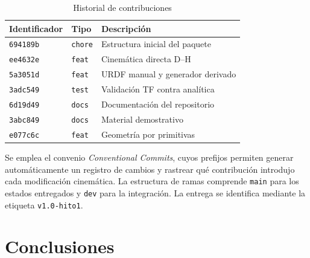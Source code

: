 \documentclass[11pt,a4paper]{article}
\begin{document}
\begin{table}[h]
\centering
\caption{Historial de contribuciones}
\label{tab:commits}
\small
\begin{tabular}{@{}lll@{}}
\toprule
\textbf{Identificador} & \textbf{Tipo} & \textbf{Descripción} \\
\midrule
\texttt{694189b} & \texttt{chore} & Estructura inicial del paquete \\
\texttt{ee4632e} & \texttt{feat} & Cinemática directa D--H \\
\texttt{5a3051d} & \texttt{feat} & URDF manual y generador derivado \\
\texttt{3adc549} & \texttt{test} & Validación TF contra analítica \\
\texttt{6d19d49} & \texttt{docs} & Documentación del repositorio \\
\texttt{3abc849} & \texttt{docs} & Material demostrativo \\
\texttt{e077c6c} & \texttt{feat} & Geometría por primitivas \\
\bottomrule
\end{tabular}
\end{table}

Se emplea el convenio \emph{Conventional Commits}, cuyos prefijos
permiten generar automáticamente un registro de cambios y rastrear qué
contribución introdujo cada modificación cinemática. La estructura de
ramas comprende \texttt{main} para los estados entregados y \texttt{dev}
para la integración. La entrega se identifica mediante la etiqueta
\texttt{v1.0-hito1}.

\section{Conclusiones}
\end{document}
